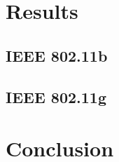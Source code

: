 \documentclass[12pt]{article}
\begin{document}
\section{Results} \label{results}
	\subsection{IEEE 802.11b} \label{resutls:11b}
	\subsection{IEEE 802.11g} \label{resutls:11g}

\section{Conclusion} \label{concluion}


\nocite{*}
\appendix %
\end{document}
